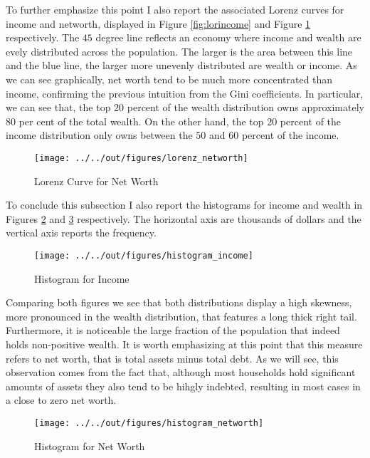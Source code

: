 \documentclass[11pt, a4paper, leqno]{article}
\begin{document}
To further emphasize this point I also report the associated Lorenz curves for income and networth, displayed in Figure \ref*{fig:lorincome} and Figure \ref*{fig:lornetworth} respectively. The $45$ degree line reflects an economy where income and wealth are evely distributed across the population. The larger is the area between this line and the blue line, the larger more unevenly distributed are wealth or income. As we can see graphically, net worth tend to be much more concentrated than income, confirming the previous intuition from the Gini coefficients. In particular, we can see that, the top $20$ percent of the wealth distribution owns approximately $80$ per cent of the total wealth. On the other hand, the top $20$ percent of the income distribution only owns between the $50$ and $60$ percent of the income. 


\begin{figure}[H]
    \caption{Lorenz Curve for Net Worth}
    
    \texttt{[image: ../../out/figures/lorenz\_networth]}
    \label{fig:lornetworth}

\end{figure}

To conclude this subsection I also report the histograms for income and wealth in Figures \ref*{fig:histincome} and \ref*{fig:histnetworth} respectively. The horizontal axis are thousands of dollars and the vertical axis reports the frequency. 

\begin{figure}[H]
    \caption{Histogram for Income}
    
    \texttt{[image: ../../out/figures/histogram\_income]}
    \label{fig:histincome}
\end{figure}

Comparing both figures we see that both distributions display a high skewness, more pronounced in the wealth distribution, that features a long thick right tail. Furthermore, it is noticeable the large fraction of the population that indeed holds non-positive wealth. It is worth emphasizing at this point that this measure refers to net worth, that is total assets minus total debt. As we will see, this observation comes from the fact that, although most households hold significant amounts of assets they also tend to be hihgly indebted, resulting in most cases in a close to zero net worth.

\begin{figure}[H]
    \caption{Histogram for Net Worth}
    
    \texttt{[image: ../../out/figures/histogram\_networth]}
    \label{fig:histnetworth}
\end{figure}
\end{document}
